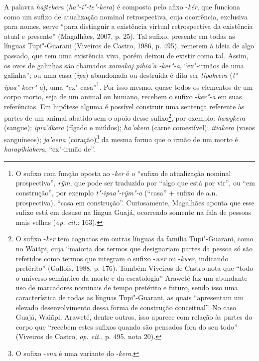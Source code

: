 A palavra \emph{hajtekera} (\emph{ha"-i"-te"-kera}) é composta pelo afixo
-\emph{kér}, que funciona como um sufixo de atualização nominal
retrospectiva, cuja ocorrência, exclusiva para nomes, serve ``para
distinguir a existência virtual retrospectiva da existência atual e
presente'' (Magalhães, 2007, p. 25). Tal sufixo, presente em todas as
línguas Tupi"-Guarani (Viveiros de Castro, 1986, p. 495), remetem à ideia
de algo passado, que tem uma existência viva, porém deixou de existir
como tal. Assim, os ovos de galinhas são chamados \emph{xamakaj pihia'a
-ker"-a}, ``ex"-irmãos de uma galinha''; ou uma casa (\emph{ipa}) abandonada
ou destruída é dita ser \emph{tipakeera} (\emph{t"-ipaa"-keer"-a}), uma
``ex"-casa''\footnote{O sufixo com função oposta ao -\emph{ker} é o ``sufixo
  de atualização nominal prospectiva'', \emph{rỹm}, que pode ser
  traduzido por ``algo que está por vir'', ou ``em construção'', por exemplo
  \emph{t"-ipaa"-rỹm"-a} (``casa'' + sufixo de a.n. prospectiva), ``casa em
      construção''. Curiosamente, Magalhães aponta que esse sufixo está em
  desuso na língua Guajá, ocorrendo somente na fala de pessoas mais
  velhas (\emph{op. cit.}: 163).}. Por isso mesmo, quase todos os elementos de
um corpo morto, seja de um animal ou humano, recebem o sufixo
-\emph{ker"-a} em suas referências. Em hipótese alguma é possível
construir uma sentença referente às partes de um animal abatido sem o
apoio desse sufixo\footnote{O sufixo -\emph{ker} tem cognatos em outras
  línguas da família Tupi"-Guarani, como no Waiãpi, cuja ``maioria dos
  termos que designariam partes da pessoa só são referidos como termos
  que integram o sufixo -\emph{wer} ou -\emph{kwer}, indicando pretérito''
  (Gallois, 1988, p. 176). Também Viveiros de Castro nota que ``todo o
      universo semântico da morte e da escatologia'' Araweté faz um abundante
  uso de marcadores nominais de tempo pretérito e futuro, sendo isso uma
  característica de todas as línguas Tupi"-Guarani, as quais ``apresentam
      um elevado desenvolvimento dessa forma de construção conceitual''. No
  caso Guajá, Waiãpi, Araweté, dentre outros, isso aparece com relação
  às partes do corpo que ``recebem estes sufixos quando são pensados fora
      do seu todo'' (Viveiros de Castro, \emph{op. cit.}, p. 495, nota 20).}, por
exemplo: \emph{hawykera} (sangue); \emph{ipia'ákera} (fígado e miúdos);
\emph{ha'okera} (carne comestível); \emph{itiakera} (vasos sanguíneos);
\emph{ja'aena} (coração)\footnote{O sufixo -\emph{ena} é uma variante do
  -\emph{kera}.} da mesma forma que o irmão de um morto é
\emph{harapihiakera}, ``ex"-irmão de''.

